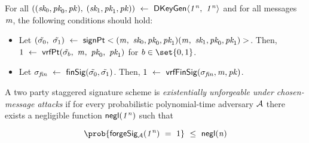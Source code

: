 \begin{definition}
	For all $((\textit{sk}_0, \textit{pk}_0, \mathit{pk}),$ $(\textit{sk}_1, \textit{pk}_1, \mathit{pk})) ~\leftarrow~ \mathsf{DKeyGen}\langle \mathit{1^n} ,~ \mathit{1^n} \rangle$ and for all messages $\mathit{m}$, the following conditions should hold:
	\begin{itemize}
		\item Let $(\tilde{\sigma_0} ,~ \tilde{\sigma_1}) ~\leftarrow~ \mathsf{signPt}<(\mathit{m} ,~ \textit{sk}_0, \textit{pk}_0, \textit{pk}_1)(\mathit{m} ,~ \textit{sk}_1, \textit{pk}_0, \textit{pk}_1)>$. Then, $1 ~\leftarrow~ \mathsf{vrfPt}(\tilde{\sigma_b} ,~ \mathit{m} ,~ \textit{pk}_0 ,~ \textit{pk}_1)$ for $b \in \set{0,1}$. 
		\item  Let $\sigma_{\mathit{fin}} ~\leftarrow~ \mathsf{finSig}(\tilde{\sigma_0},\tilde{\sigma_1})$. Then, $1 ~\leftarrow~ \mathsf{vrfFinSig}(\sigma_{\mathit{fin}}, \mathit{m}, \mathit{pk})$. 
	\end{itemize}
\end{definition}


\begin{definition}
	A two party staggered signature scheme is \emph{existentially unforgeable under chosen-message attacks} if for every probabilistic polynomial-time adversary $\mathcal{A}$ there exists a negligible function $\mathsf{negl}(\mathit{1^n})$ such that 

\[ \prob{\procExpForgeSimple{\varSecParam} \opEqNoQ 1} \opSmEq \funNegl{\varN} \]

\begin{center}
    \fbox{
    \begin{varwidth}{\textwidth}
        \procedure[linenumbering]{$\procExpForgeSimple{\varSecParam}$} {
         \varSet \opAssign \cnstEmptySet \\
        ((\varSecKeyAlice, \varPubKeyAlice), (\varSecKeyBob, \varPubKeyBob)) \opFunResult \procKeyGenPt{\varSecParam}{\varSecParam}\\
        (\varMsg^* \opSeperate (\varSigAlice^*, \varSigBob^*)) \opFunResult \cnstAdversary^{\procSignOracleOne{\cdot}}(\varPubKeyAlice, \varPubKeyBob, \varSecKeyBob) \\
        \varSignature^* \opFunResult \procFinSig{\varSigAlice^*}{\varSigBob^*} \\
        \pcreturn ((\varMsg) \opNotIn \varSet  \opAnd \procVerFinSig(\varSignature^*, \varMsg^*, \varPubKey))
        }\\[2\baselineskip]
        \procedure[linenumbering]{$\procSignOracleOne{\varMsg}$} {
        (\varSigAlice \opSeperate \varSigBob) \opFunResult \procSignPt{\varMsg}{\varSecKeyAlice, \varPubKeyAlice, \varPubKeyBob}{\varSecKeyBob, \varPubKeyAlice, \varPubKeyBob}\\
        \varSet \opAssign \varSet \opUnion \{\varMsg\} \\
        \pcreturn (\varSigAlice \opSeperate \varSigBob)
        }
    \end{varwidth}
    }
\end{center}

\end{definition}



